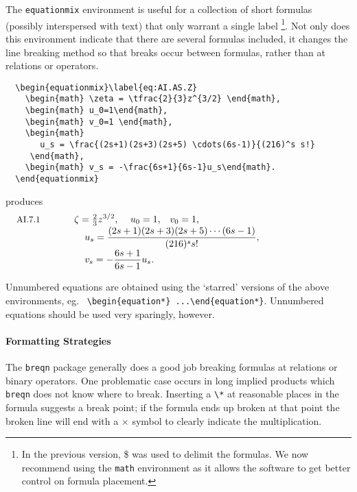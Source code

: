 \documentclass[twoside]{article}
\newcommand{\package}[1]{\texttt{#1}}
\newcommand{\token}[1]{\texttt{#1}}
\begin{document}
The \token{equationmix} environment is useful for a collection of short formulas
(possibly interspersed with text) that only warrant a single label
\footnote{In the previous version, \$ was used to delimit the formulas. We now recommend
using the \token{math} environment as it allows the software to get better control
on formula placement.}. 
Not only does this environment indicate that there are several formulas included,
it changes the line breaking method so that breaks occur between formulas,
rather than at relations or operators.
\begin{verbatim}
  \begin{equationmix}\label{eq:AI.AS.Z}
    \begin{math} \zeta = \tfrac{2}{3}z^{3/2} \end{math}, 
    \begin{math} u_0=1\end{math},
    \begin{math} v_0=1 \end{math},
    \begin{math}
       u_s = \frac{(2s+1)(2s+3)(2s+5) \cdots(6s-1)}{(216)^s s!}
     \end{math},
    \begin{math} v_s = -\frac{6s+1}{6s-1}u_s\end{math}.
  \end{equationmix}
\end{verbatim}
produces
\[
\vbox{
\hbox to \textwidth{
\hbox to 0pt {\small AI.7.1}\hspace{2cm}
    $\displaystyle \zeta = \tfrac{2}{3}z^{3/2}$, \quad
    $\displaystyle u_0=1$,\quad
    $\displaystyle v_0=1$, 
\hfill}
\hbox to \textwidth{\hspace{2.5cm}
    $\displaystyle u_s = \frac{(2s+1)(2s+3)(2s+5)\cdots(6s-1)}{(216)^s s!}$,
\hfill}
\hbox to \textwidth{\hspace{2.5cm}
    $\displaystyle v_s = -\frac{6s+1}{6s-1}u_s$.
\hfill}}
\]

Unnumbered equations are obtained using the `starred' versions of the above 
environments, eg.~ \verb|\begin{equation*} ...\end{equation*}|.  Unnumbered equations
should be used very sparingly, however.

\paragraph{Formatting Strategies}
The \package{breqn} package generally does a good job breaking formulas at
relations or binary operators.  One problematic case occurs in long
implied products which \package{breqn} does not know where to break.
Inserting a \verb|\*| at reasonable places in the formula suggests a break
point; if the formula ends up broken at that point the broken line
will end with a $\times$ symbol to clearly indicate the multiplication.
\end{document}
